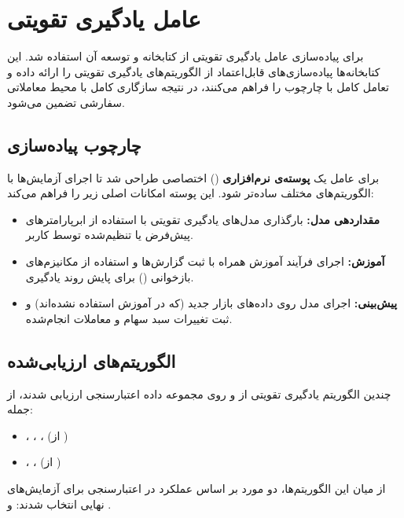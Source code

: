 \documentclass[12pt, a4paper]{report}
\begin{document}
\section{عامل یادگیری تقویتی}
\label{sec:rl_agent}

برای پیاده‌سازی عامل یادگیری تقویتی از کتابخانه  و توسعه آن  استفاده شد.  
این کتابخانه‌ها پیاده‌سازی‌های قابل‌اعتماد از الگوریتم‌های یادگیری تقویتی را ارائه داده و تعامل کامل با چارچوب  را فراهم می‌کنند، در نتیجه سازگاری کامل با محیط معاملاتی سفارشی تضمین می‌شود.  

\subsection{چارچوب پیاده‌سازی}
برای عامل یک \textbf{پوسته‌ی نرم‌افزاری} () اختصاصی طراحی شد تا اجرای آزمایش‌ها با الگوریتم‌های مختلف ساده‌تر شود.  
این پوسته امکانات اصلی زیر را فراهم می‌کند:
\begin{itemize}
    \item \textbf{مقداردهی مدل:} بارگذاری مدل‌های یادگیری تقویتی با استفاده از ابرپارامترهای پیش‌فرض یا تنظیم‌شده توسط کاربر.  
    \item \textbf{آموزش:} اجرای فرآیند آموزش همراه با ثبت گزارش‌ها و استفاده از مکانیزم‌های بازخوانی () برای پایش روند یادگیری.  
    \item \textbf{پیش‌بینی:} اجرای مدل روی داده‌های بازار جدید (که در آموزش استفاده نشده‌اند) و ثبت تغییرات سبد سهام و معاملات انجام‌شده.  
\end{itemize}

\subsection{الگوریتم‌های ارزیابی‌شده}
چندین الگوریتم یادگیری تقویتی از  و  روی مجموعه داده اعتبارسنجی ارزیابی شدند، از جمله:
\begin{itemize}
    \item {}، ، ،  (از )  
    \item {}، ،  (از )  
\end{itemize}

از میان این الگوریتم‌ها، دو مورد بر اساس عملکرد در اعتبارسنجی برای آزمایش‌های نهایی انتخاب شدند:  
 و .  
\end{document}
